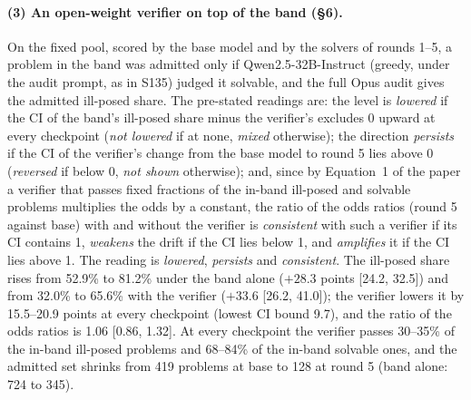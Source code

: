\documentclass[10pt,a4paper]{article}
\begin{document}
\paragraph{(3) An open-weight verifier on top of the band (\S6).} On the fixed pool, scored by the base model and by the solvers of rounds 1--5, a problem in the band was admitted only if Qwen2.5-32B-Instruct (greedy, under the audit prompt, as in S135) judged it solvable, and the full Opus audit gives the admitted ill-posed share. The pre-stated readings are: the level is \emph{lowered} if the CI of the band's ill-posed share minus the verifier's excludes 0 upward at every checkpoint (\emph{not lowered} if at none, \emph{mixed} otherwise); the direction \emph{persists} if the CI of the verifier's change from the base model to round 5 lies above 0 (\emph{reversed} if below 0, \emph{not shown} otherwise); and, since by Equation~1 of the paper a verifier that passes fixed fractions of the in-band ill-posed and solvable problems multiplies the odds by a constant, the ratio of the odds ratios (round 5 against base) with and without the verifier is \emph{consistent} with such a verifier if its CI contains 1, \emph{weakens} the drift if the CI lies below 1, and \emph{amplifies} it if the CI lies above 1. The reading is \emph{lowered}, \emph{persists} and \emph{consistent}. The ill-posed share rises from 52.9\% to 81.2\% under the band alone ($+28.3$ points [24.2, 32.5]) and from 32.0\% to 65.6\% with the verifier ($+33.6$ [26.2, 41.0]); the verifier lowers it by 15.5--20.9 points at every checkpoint (lowest CI bound 9.7), and the ratio of the odds ratios is 1.06 [0.86, 1.32]. At every checkpoint the verifier passes 30--35\% of the in-band ill-posed problems and 68--84\% of the in-band solvable ones, and the admitted set shrinks from 419 problems at base to 128 at round 5 (band alone: 724 to 345).
\end{document}
